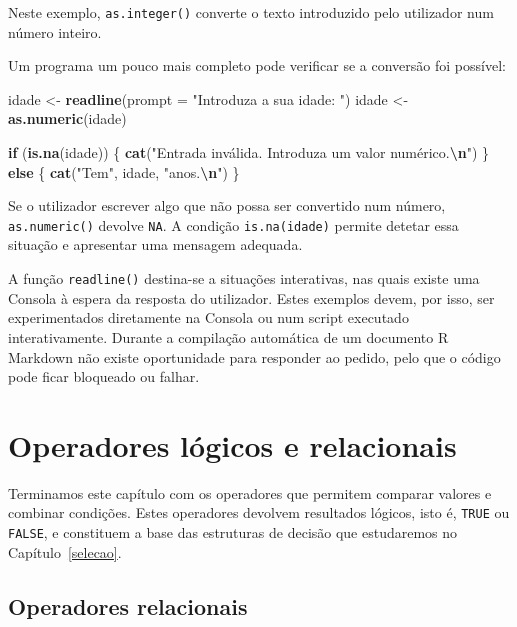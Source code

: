\documentclass[
  portuguese,
  11pt,
  openany]{book}
\newenvironment{Shaded}{\begin{snugshade}}{\end{snugshade}}
\newcommand{\AttributeTok}[1]{\textcolor[rgb]{0.13,0.29,0.53}{#1}}
\newcommand{\ControlFlowTok}[1]{\textcolor[rgb]{0.13,0.29,0.53}{\textbf{#1}}}
\newcommand{\FunctionTok}[1]{\textcolor[rgb]{0.13,0.29,0.53}{\textbf{#1}}}
\newcommand{\NormalTok}[1]{#1}
\newcommand{\OtherTok}[1]{\textcolor[rgb]{0.56,0.35,0.01}{#1}}
\newcommand{\SpecialCharTok}[1]{\textcolor[rgb]{0.81,0.36,0.00}{\textbf{#1}}}
\newcommand{\StringTok}[1]{\textcolor[rgb]{0.31,0.60,0.02}{#1}}
\begin{document}
Neste exemplo, \texttt{as.integer()} converte o texto introduzido pelo utilizador num número inteiro.

Um programa um pouco mais completo pode verificar se a conversão foi possível:

\begin{Shaded}
\begin{Highlighting}[]
\NormalTok{idade }\OtherTok{\textless{}{-}} \FunctionTok{readline}\NormalTok{(}\AttributeTok{prompt =} \StringTok{"Introduza a sua idade: "}\NormalTok{)}
\NormalTok{idade }\OtherTok{\textless{}{-}} \FunctionTok{as.numeric}\NormalTok{(idade)}

\ControlFlowTok{if}\NormalTok{ (}\FunctionTok{is.na}\NormalTok{(idade)) \{}
  \FunctionTok{cat}\NormalTok{(}\StringTok{"Entrada inválida. Introduza um valor numérico.}\SpecialCharTok{\textbackslash{}n}\StringTok{"}\NormalTok{)}
\NormalTok{\} }\ControlFlowTok{else}\NormalTok{ \{}
  \FunctionTok{cat}\NormalTok{(}\StringTok{"Tem"}\NormalTok{, idade, }\StringTok{"anos.}\SpecialCharTok{\textbackslash{}n}\StringTok{"}\NormalTok{)}
\NormalTok{\}}
\end{Highlighting}
\end{Shaded}

Se o utilizador escrever algo que não possa ser convertido num número, \texttt{as.numeric()} devolve \texttt{NA}. A condição \texttt{is.na(idade)} permite detetar essa situação e apresentar uma mensagem adequada.

A função \texttt{readline()} destina-se a situações interativas, nas quais existe uma Consola à espera da resposta do utilizador. Estes exemplos devem, por isso, ser experimentados diretamente na Consola ou num script executado interativamente. Durante a compilação automática de um documento R Markdown não existe oportunidade para responder ao pedido, pelo que o código pode ficar bloqueado ou falhar.

\section{Operadores lógicos e relacionais}\label{operadores-luxf3gicos-e-relacionais}

Terminamos este capítulo com os operadores que permitem comparar valores e combinar condições. Estes operadores devolvem resultados lógicos, isto é, \texttt{TRUE} ou \texttt{FALSE}, e constituem a base das estruturas de decisão que estudaremos no Capítulo~\ref{selecao}.

\subsection{Operadores relacionais}\label{operadores-relacionais}
\end{document}
